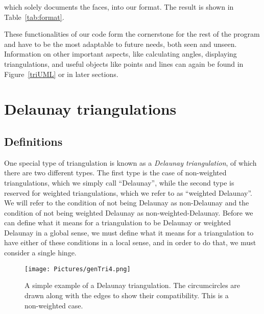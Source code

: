 \documentclass[12pt]{article}
\begin{document}
 which solely documents the faces, into our format. The result is shown in Table~\ref{tab:format}.

 These functionalities of our code form the cornerstone for the rest of the program and have to be the most adaptable to future needs, both seen and unseen. Information on other important aspects, like calculating angles, displaying triangulations, and useful objects like points and lines can again be found in Figure~\ref{triUML} or in later sections. 

\section{Delaunay triangulations}
\label{DT}

\subsection{Definitions}
\label{DTD}

 One special type of triangulation is known as a \textit{Delaunay triangulation}, of which there are two different types. The first type is the case of non-weighted triangulations, which we simply call ``Delaunay'', while the second type is reserved for weighted triangulations, which we refer to as ``weighted Delaunay''. We will refer to the condition of not being Delaunay as non-Delaunay and the condition of not being weighted Delaunay as non-weighted-Delaunay. Before we can define what it means for a triangulation to be Delaunay or weighted Delaunay in a global sense, we must define what it means for a triangulation to have either of these conditions in a local sense, and in order to do that, we must consider a single hinge.

\begin{figure}
\centering
\texttt{[image: Pictures/genTri4.png]}
\caption{A simple example of a Delaunay triangulation. The circumcircles are drawn along with the edges to show their compatibility. This is a non-weighted case.}
\label{genTri}
\end{figure}
\end{document}
